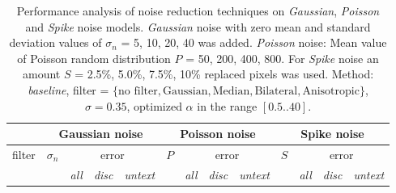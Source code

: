 \begin{table}[ht] \scriptsize
  \centering
  \caption{Performance analysis of noise reduction techniques on \textit{Gaussian}, \textit{Poisson} and \textit{Spike} noise models.  \textit{Gaussian} noise with zero mean  and standard deviation values of $\sigma_n$ = 5, 10, 20, 40 was added. \textit{Poisson} noise: Mean value of Poisson random distribution $P$ = 50, 200, 400, 800. For \textit{Spike} noise an amount $S$ = 2.5\%, 5.0\%, 7.5\%, 10\% replaced pixels was used. Method: \textit{baseline}, filter = $\lbrace \text{no filter}, \text{Gaussian}, \text{Median}, \text{Bilateral}, \text{Anisotropic}  \rbrace$, $\sigma=0.35$, optimized $\alpha$ in the range $[0.5 .. 40]$.}
    \begin{tabular}{rrrrrrrrrrrrr}
    \toprule
          & \multicolumn{4}{c}{Gaussian noise} & \multicolumn{4}{c}{Poisson noise} & \multicolumn{4}{c}{Spike noise} \\
    \midrule
    \multicolumn{1}{c}{filter} & \multicolumn{1}{c}{$\sigma_n$} & \multicolumn{3}{c}{error} & \multicolumn{1}{c}{$P$} & \multicolumn{3}{c}{error} & \multicolumn{1}{c}{$S$} & \multicolumn{3}{c}{error} \\
    
    \midrule
    
          &       & \multicolumn{1}{c}{\textit{all}} & \multicolumn{1}{c}{\textit{disc}} & \multicolumn{1}{c}{\textit{untext}} &       & \multicolumn{1}{c}{\textit{all}} & \multicolumn{1}{c}{\textit{disc}} & \multicolumn{1}{c}{\textit{untext}} &       & \multicolumn{1}{c}{\textit{all}} & \multicolumn{1}{c}{\textit{disc}} & \multicolumn{1}{c}{\textit{untext}} \\
          
          \midrule
          \midrule
          

\end{tabular}
\end{table}
